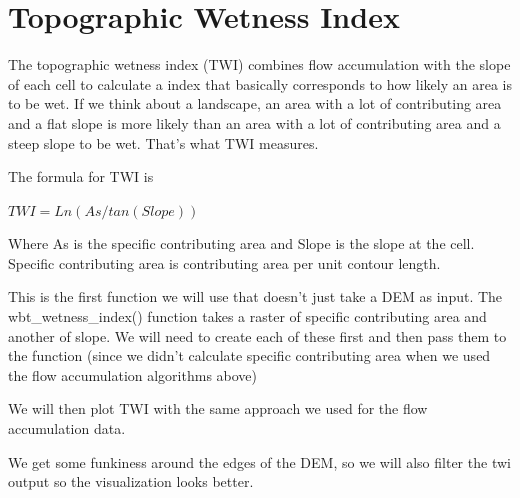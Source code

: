 \documentclass[
]{book}
\begin{document}
\hypertarget{topographic-wetness-index}{%
\section{Topographic Wetness Index}\label{topographic-wetness-index}}

The topographic wetness index (TWI) combines flow accumulation with the slope of each cell to calculate a index that basically corresponds to how likely an area is to be wet. If we think about a landscape, an area with a lot of contributing area and a flat slope is more likely than an area with a lot of contributing area and a steep slope to be wet. That's what TWI measures.

The formula for TWI is

\(TWI = Ln(As / tan(Slope))\)

Where As is the specific contributing area and Slope is the slope at the cell. Specific contributing area is contributing area per unit contour length.

This is the first function we will use that doesn't just take a DEM as input. The wbt\_wetness\_index() function takes a raster of specific contributing area and another of slope. We will need to create each of these first and then pass them to the function (since we didn't calculate specific contributing area when we used the flow accumulation algorithms above)

We will then plot TWI with the same approach we used for the flow accumulation data.

We get some funkiness around the edges of the DEM, so we will also filter the twi output so the visualization looks better.
\end{document}
